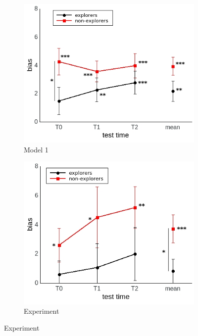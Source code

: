 \documentclass[a4paper]{scrreprt}
\begin{document}
\begin{figure}
\centering
\begin{subfigure}[b]{0.49\textwidth}
        \includegraphics[width=\textwidth]{figs/sec3/temp/temp_mod1mod1.jpeg}
        \caption{Model 1}
    \end{subfigure}
    \begin{subfigure}[b]{0.49\textwidth}
        \includegraphics[width=\textwidth]{figs/sec3/temp/temp_mod1dat.jpeg}
        \caption{Experiment}
    \end{subfigure}


\end{figure}
\end{document}
